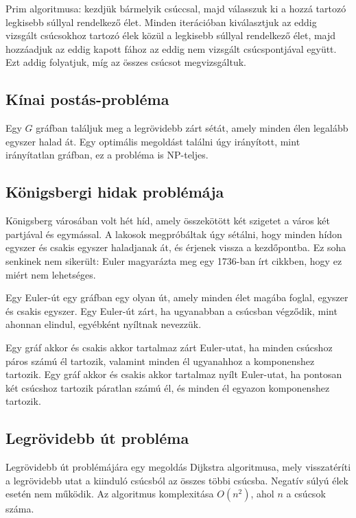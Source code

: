Prim algoritmusa: kezdjük bármelyik csúccsal, majd válasszuk ki a hozzá tartozó legkisebb súllyal rendelkező élet. Minden iterációban kiválasztjuk az eddig vizsgált csúcsokhoz tartozó élek közül a legkisebb súllyal rendelkező élet, majd hozzáadjuk az eddig kapott fához az eddig nem vizsgált csúcspontjával együtt. Ezt addig folyatjuk, míg az összes csúcsot megvizsgáltuk.

\subsection{Kínai postás-probléma}

Egy \(G\) gráfban találjuk meg a legrövidebb zárt sétát, amely minden élen legalább egyszer halad át. Egy optimális megoldást találni úgy irányított, mint irányítatlan gráfban, ez a probléma is NP-teljes.

\subsection{Königsbergi hidak problémája}

Königsberg városában volt hét híd, amely összekötött két szigetet a város két partjával és egymással. A lakosok megpróbáltak úgy sétálni, hogy minden hídon egyszer és csakis egyszer haladjanak át, és érjenek vissza a kezdőpontba. Ez soha senkinek nem sikerült: Euler magyarázta meg egy 1736-ban írt cikkben, hogy ez miért nem lehetséges.

Egy Euler-út egy gráfban egy olyan út, amely minden élet magába foglal, egyszer és csakis egyszer. Egy Euler-út zárt, ha ugyanabban a csúcsban végződik, mint ahonnan elindul, egyébként nyíltnak nevezzük.

Egy gráf akkor és csakis akkor tartalmaz zárt Euler-utat, ha minden csúcshoz páros számú él tartozik, valamint minden él ugyanahhoz a komponenshez tartozik. Egy gráf akkor és csakis akkor tartalmaz nyílt Euler-utat, ha pontosan két csúcshoz tartozik páratlan számú él, és minden él egyazon komponenshez tartozik.

\subsection{Legrövidebb út probléma}

Legrövidebb út problémájára egy megoldás Dijkstra algoritmusa, mely visszatéríti a legrövidebb utat a kiinduló csúcsból az összes többi csúcsba. Negatív súlyú élek esetén nem működik. Az algoritmus komplexitása \(O(n^2)\), ahol \(n\) a csúcsok száma.


